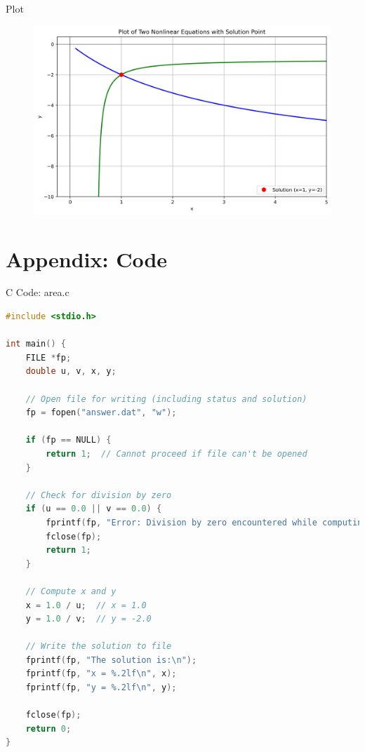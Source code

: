 \documentclass{beamer}
\numberwithin{equation}{section}
\theoremstyle{remark}
\begin{document}
\begin{frame}{Plot}
    \begin{figure}
    \centering
    \includegraphics[width=0.85\columnwidth]{figs/01.png}
    \caption{}
    \label{fig:placeholder}
\end{figure}
\end{frame}

\section*{Appendix: Code}

\begin{frame}[fragile]{C Code: area.c}
\begin{lstlisting}[language=C]
#include <stdio.h>

int main() {
    FILE *fp;
    double u, v, x, y;

    // Open file for writing (including status and solution)
    fp = fopen("answer.dat", "w");

    if (fp == NULL) {
        return 1;  // Cannot proceed if file can't be opened
    }

    // Check for division by zero
    if (u == 0.0 || v == 0.0) {
        fprintf(fp, "Error: Division by zero encountered while computing x or y.\n");
        fclose(fp);
        return 1;
    }

    // Compute x and y
    x = 1.0 / u;  // x = 1.0
    y = 1.0 / v;  // y = -2.0

    // Write the solution to file
    fprintf(fp, "The solution is:\n");
    fprintf(fp, "x = %.2lf\n", x);
    fprintf(fp, "y = %.2lf\n", y);

    fclose(fp);
    return 0;
}


\end{lstlisting}
\end{frame}
\end{document}
